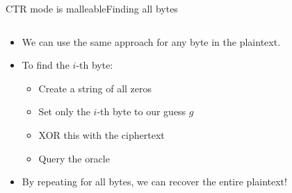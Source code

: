 \documentclass[aspectratio=169, lualatex, handout]{beamer}
\begin{document}
\begin{frame}{CTR mode is malleable}{Finding all bytes}
	\begin{columns}[c]
		\begin{column}{0.6\textwidth}
			\begin{itemize}
				\item We can use the same approach for any byte in the plaintext.
				\item To find the $i$-th byte:
				      \begin{itemize}
					      \item Create a string of all zeros
					      \item Set only the $i$-th byte to our guess $g$
					      \item XOR this with the ciphertext
					      \item Query the oracle
				      \end{itemize}
				\item By repeating for all bytes, we can recover the entire plaintext!
			\end{itemize}
		\end{column}
		\begin{column}{0.4\textwidth}
		\end{column}
	\end{columns}
\end{frame}
\end{document}
